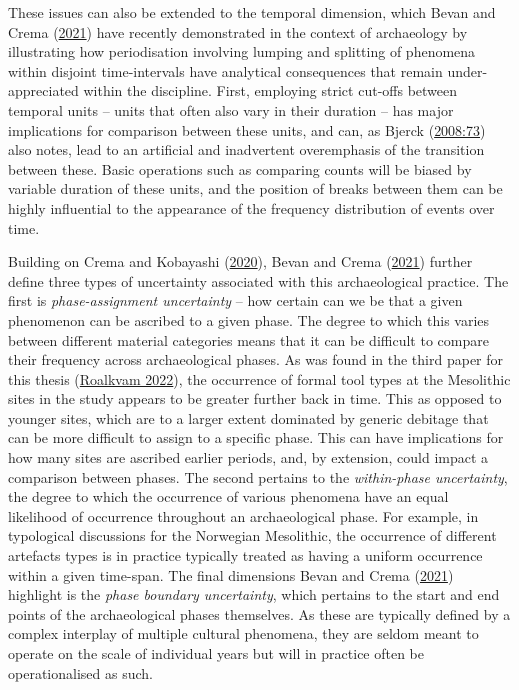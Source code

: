 \documentclass[
  12pt,
  a4paper,
  oneside]{book}
\begin{document}
These issues can also be extended to the temporal dimension, which Bevan and Crema (\protect\hyperlink{ref-bevan2021}{2021}) have recently demonstrated in the context of archaeology by illustrating how periodisation involving lumping and splitting of phenomena within disjoint time-intervals have analytical consequences that remain under-appreciated within the discipline. First, employing strict cut-offs between temporal units -- units that often also vary in their duration -- has major implications for comparison between these units, and can, as Bjerck (\protect\hyperlink{ref-bjerck2008}{2008:73}) also notes, lead to an artificial and inadvertent overemphasis of the transition between these. Basic operations such as comparing counts will be biased by variable duration of these units, and the position of breaks between them can be highly influential to the appearance of the frequency distribution of events over time.

Building on Crema and Kobayashi (\protect\hyperlink{ref-crema2020}{2020}), Bevan and Crema (\protect\hyperlink{ref-bevan2021}{2021}) further define three types of uncertainty associated with this archaeological practice. The first is \emph{phase-assignment uncertainty} -- how certain can we be that a given phenomenon can be ascribed to a given phase. The degree to which this varies between different material categories means that it can be difficult to compare their frequency across archaeological phases. As was found in the third paper for this thesis (\protect\hyperlink{ref-roalkvam2022}{Roalkvam 2022}), the occurrence of formal tool types at the Mesolithic sites in the study appears to be greater further back in time. This as opposed to younger sites, which are to a larger extent dominated by generic debitage that can be more difficult to assign to a specific phase. This can have implications for how many sites are ascribed earlier periods, and, by extension, could impact a comparison between phases. The second pertains to the \emph{within-phase uncertainty}, the degree to which the occurrence of various phenomena have an equal likelihood of occurrence throughout an archaeological phase. For example, in typological discussions for the Norwegian Mesolithic, the occurrence of different artefacts types is in practice typically treated as having a uniform occurrence within a given time-span. The final dimensions Bevan and Crema (\protect\hyperlink{ref-bevan2021}{2021}) highlight is the \emph{phase boundary uncertainty}, which pertains to the start and end points of the archaeological phases themselves. As these are typically defined by a complex interplay of multiple cultural phenomena, they are seldom meant to operate on the scale of individual years but will in practice often be operationalised as such.
\end{document}
